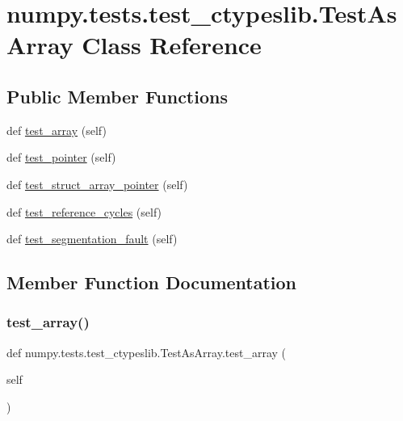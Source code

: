 \hypertarget{classnumpy_1_1tests_1_1test__ctypeslib_1_1TestAsArray}{}\section{numpy.\+tests.\+test\+\_\+ctypeslib.\+Test\+As\+Array Class Reference}
\label{classnumpy_1_1tests_1_1test__ctypeslib_1_1TestAsArray}
\subsection*{Public Member Functions}
\begin{DoxyCompactItemize}
\item 
def \hyperlink{classnumpy_1_1tests_1_1test__ctypeslib_1_1TestAsArray_aaa74a66625f9d43b11a10636a03c5b42}{test\+\_\+array} (self)
\item 
def \hyperlink{classnumpy_1_1tests_1_1test__ctypeslib_1_1TestAsArray_a5476cb1dfb1a33c0ae0962452a835060}{test\+\_\+pointer} (self)
\item 
def \hyperlink{classnumpy_1_1tests_1_1test__ctypeslib_1_1TestAsArray_a445a6d98c05b3a33dd6ebaaaab766fcc}{test\+\_\+struct\+\_\+array\+\_\+pointer} (self)
\item 
def \hyperlink{classnumpy_1_1tests_1_1test__ctypeslib_1_1TestAsArray_a55d33c6c619450f051cad7a88f0338fa}{test\+\_\+reference\+\_\+cycles} (self)
\item 
def \hyperlink{classnumpy_1_1tests_1_1test__ctypeslib_1_1TestAsArray_ac2557bb5a412a7675e6414ff86268845}{test\+\_\+segmentation\+\_\+fault} (self)
\end{DoxyCompactItemize}


\subsection{Member Function Documentation}
\mbox{\label{classnumpy_1_1tests_1_1test__ctypeslib_1_1TestAsArray_aaa74a66625f9d43b11a10636a03c5b42}} 
\subsubsection{\texorpdfstring{test\+\_\+array()}{test\_array()}}
{\footnotesize\ttfamily def numpy.\+tests.\+test\+\_\+ctypeslib.\+Test\+As\+Array.\+test\+\_\+array (\begin{DoxyParamCaption}\item[{}]{self }\end{DoxyParamCaption})}

